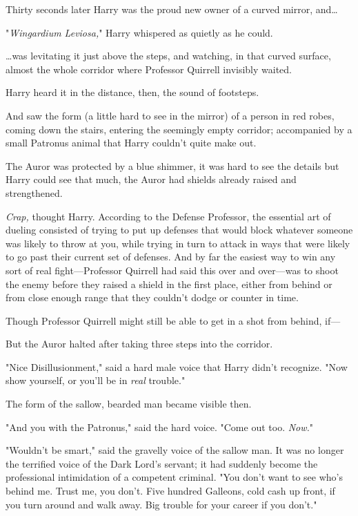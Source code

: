 Thirty seconds later Harry was the proud new owner of a curved mirror,
and{\ldots}

"\emph{Wingardium Leviosa,}" Harry whispered as quietly as he could.

{\ldots}was levitating it just above the steps, and watching, in that curved
surface, almost the whole corridor where Professor Quirrell invisibly waited.

Harry heard it in the distance, then, the sound of footsteps.

And saw the form (a little hard to see in the mirror) of a person in red robes,
coming down the stairs, entering the seemingly empty corridor; accompanied by a
small Patronus animal that Harry couldn't quite make out.

The Auror was protected by a blue shimmer, it was hard to see the details but
Harry could see that much, the Auror had shields already raised and
strengthened.

\emph{Crap,} thought Harry. According to the Defense Professor, the essential
art of dueling consisted of trying to put up defenses that would block whatever
someone was likely to throw at you, while trying in turn to attack in ways that
were likely to go past their current set of defenses. And by far the easiest
way to win any sort of real fight---Professor Quirrell had said this over and
over---was to shoot the enemy before they raised a shield in the first place,
either from behind or from close enough range that they couldn't dodge or
counter in time.

Though Professor Quirrell might still be able to get in a shot from behind,
if---

But the Auror halted after taking three steps into the corridor.

"Nice Disillusionment," said a hard male voice that Harry didn't recognize.
"Now show yourself, or you'll be in \emph{real} trouble."

The form of the sallow, bearded man became visible then.

"And you with the Patronus," said the hard voice. "Come out too. \emph{Now.}"

"Wouldn't be smart," said the gravelly voice of the sallow man. It was no
longer the terrified voice of the Dark Lord's servant; it had suddenly become
the professional intimidation of a competent criminal. "You don't want to see
who's behind me. Trust me, you don't. Five hundred Galleons, cold cash up
front, if you turn around and walk away. Big trouble for your career if you
don't."

